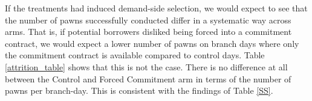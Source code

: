 \documentclass[12pt, a4paper]{article}
\begin{document}
If the treatments had induced demand-side selection, we would expect to see that the number of pawns successfully conducted differ in a systematic way across arms. That is, if potential borrowers disliked being forced into a commitment contract, we would expect a lower number of pawns on branch days where only the commitment contract is available compared to control days. Table \ref{attrition_table} shows that this is not the case. There is no difference at all between the Control and Forced Commitment arm in terms of the number of pawns per branch-day. %
This is consistent with the findings of Table \ref{SS}.




\end{document}
